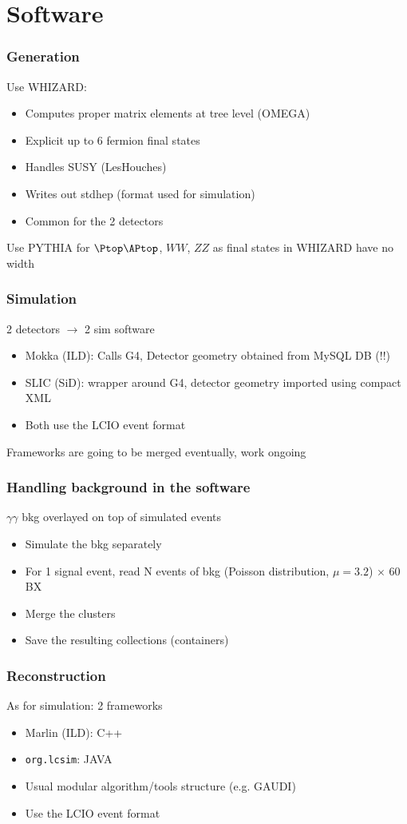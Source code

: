 \documentclass{beamer}
\begin{document}
\section{Software}
\begin{frame}
\frametitle{Generation}
Use WHIZARD:
\begin{itemize}
  \item Computes proper matrix elements at tree level (OMEGA)
  \item Explicit up to 6 fermion final states
  \item Handles SUSY (LesHouches)
  \item Writes out stdhep (format used for simulation)
  \item Common for the 2 detectors
\end{itemize}
Use PYTHIA for $\Ptop\APtop$, $WW$, $ZZ$ as final states in WHIZARD have no
width
\end{frame}
\begin{frame}
\frametitle{Simulation}
2 detectors $\to$ 2 sim software
\begin{itemize}
  \item Mokka (ILD): Calls G4, Detector geometry obtained from MySQL DB
  (\alert{!!})
  \item SLIC (SiD): wrapper around G4, detector geometry imported using compact
  XML
  \item Both use the LCIO event format
\end{itemize}
Frameworks are going to be merged eventually, work ongoing
\end{frame}
\begin{frame}
\frametitle{Handling background in the software}
$\gamma\gamma$ bkg overlayed on top of simulated events\\
\begin{itemize}
  \item Simulate the bkg separately
  \item For 1 signal event, read N events of bkg (Poisson distribution,
  $\mu=3.2$) $\times$ 60 BX
  \item Merge the clusters
  \item Save the resulting collections (containers)
\end{itemize}
\end{frame}
\begin{frame}
\frametitle{Reconstruction}
As for simulation: 2 frameworks
\begin{itemize}
  \item Marlin (ILD): C++
  \item \texttt{org.lcsim}: JAVA
  \item Usual modular algorithm/tools structure (e.g. GAUDI)
  \item Use the LCIO event format
\end{itemize}
\end{frame}
\end{document}

